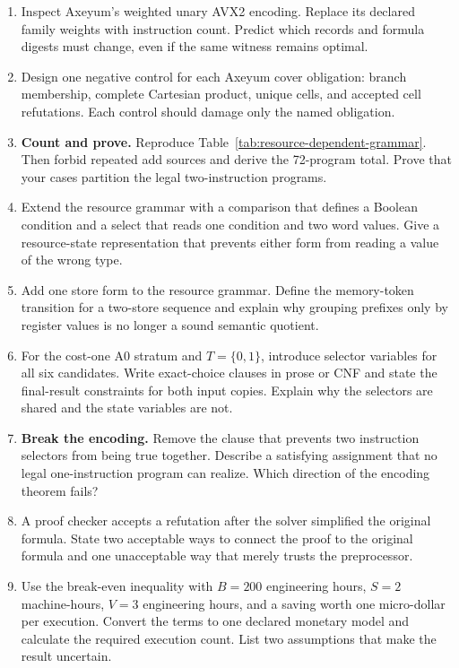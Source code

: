 \begin{enumerate}
\item Inspect Axeyum's weighted unary AVX2 encoding. Replace its declared
family weights with instruction count. Predict which records and formula
digests must change, even if the same witness remains optimal.

\item Design one negative control for each Axeyum cover obligation: branch
membership, complete Cartesian product, unique cells, and accepted cell
refutations. Each control should damage only the named obligation.

\item \textbf{Count and prove.} Reproduce
Table~\ref{tab:resource-dependent-grammar}. Then forbid repeated add sources
and derive the 72-program total. Prove that your cases partition the legal
two-instruction programs.

\item Extend the resource grammar with a comparison that defines a Boolean
condition and a select that reads one condition and two word values. Give a
resource-state representation that prevents either form from reading a value
of the wrong type.

\item Add one store form to the resource grammar. Define the memory-token
transition for a two-store sequence and explain why grouping prefixes only by
register values is no longer a sound semantic quotient.

\item For the cost-one A0 stratum and \(T=\{0,1\}\), introduce selector
variables for all six candidates. Write exact-choice clauses in prose or CNF
and state the final-result constraints for both input copies. Explain why the
selectors are shared and the state variables are not.

\item \textbf{Break the encoding.} Remove the clause that prevents two
instruction selectors from being true together. Describe a satisfying
assignment that no legal one-instruction program can realize. Which direction
of the encoding theorem fails?

\item A proof checker accepts a refutation after the solver simplified the
original formula. State two acceptable ways to connect the proof to the
original formula and one unacceptable way that merely trusts the
preprocessor.

\item Use the break-even inequality with \(B=200\) engineering hours,
\(S=2\) machine-hours, \(V=3\) engineering hours, and a saving worth one
micro-dollar per execution. Convert the terms to one declared monetary model
and calculate the required execution count. List two assumptions that make
the result uncertain.


\end{enumerate}

